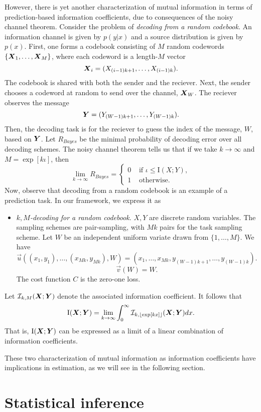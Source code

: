\documentclass[12pt]{article}
\begin{document}
However, there is yet another characterization of mutual information
in terms of prediction-based information coefficients, due to
consequences of the noisy channel theorem.  Consider the problem
of \emph{decoding from a random codebook}.  An information channel is
given by $p(y|x)$ and a source distribution is given by $p(x)$.
First, one forms a codebook consisting of $M$ random codewords
$\{\boldsymbol{X}_1,\hdots, \boldsymbol{X}_M\}$, where each codeword is a length-$M$ vector
\[
\boldsymbol{X}_i = (X_{(i-1)k+1},\hdots, X_{(i-1)k}).
\]
The codebook is shared with both the sender and the reciever.  Next,
the sender chooses a codeword at random to send over the channel,
$\boldsymbol{X}_W$.  The reciever observes the message
\[
\boldsymbol{Y} = (Y_{(W-1)k+1}, \hdots, Y_{(W-1)k}).
\]
Then, the decoding task is for the reciever to guess the index of the
message, $W$, based on $\boldsymbol{Y}$.  Let $R_{Bayes}$ be the minimal
probability of decoding error over all decoding schemes.  The noisy
channel theorem tells us that if we take $k \to \infty$ and $M
= \exp[k\iota]$, then
\[
\lim_{k \to \infty} R_{Bayes} = \begin{cases}
0 & \text{ if }\iota \leq \text{I}(X; Y),\\
1 & \text{ otherwise.}
\end{cases}
\]
Now, observe that decoding from a random codebook is an example of a
prediction task.  In our framework, we express it as
\begin{itemize}
\item \emph{$k, M$-decoding for a random codebook}.  $X, Y$ are discrete random variables. The sampling schemes are pair-sampling, with $Mk$ pairs for the task sampling scheme.
Let $W$ be an
independent uniform variate drawn from $\{1,\hdots, M\}$.  We have
\[
\vec{u}((x_1,y_1),\hdots, (x_{Mk}, y_{Mk}), W) = (x_1,\hdots, x_{Mk}, y_{(W-1)k + 1},\hdots, y_{(W-1)k}).
\]
\[
\vec{v}(W) = W.
\]
The cost function $C$ is the zero-one loss.
\end{itemize}
Let $\mathcal{I}_{k, M}(\boldsymbol{X}; \boldsymbol{Y})$ denote the associated information coefficient.  It follows that
\[
\text{I}(\boldsymbol{X}; \boldsymbol{Y}) = \lim_{k \to \infty} \int_0^\infty \mathcal{I}_{k, \lfloor \exp[kx] \rfloor}(\boldsymbol{X}; \boldsymbol{Y}) dx.
\]
That is, $\text{I}(\boldsymbol{X}; \boldsymbol{Y})$ can be expressed as a limit of a linear
combination of information coefficients.

These two characterization of mutual information as information
coefficients have implications in estimation, as we will see in the
following section.

\section{Statistical inference}\label{sec:inference}
\end{document}
